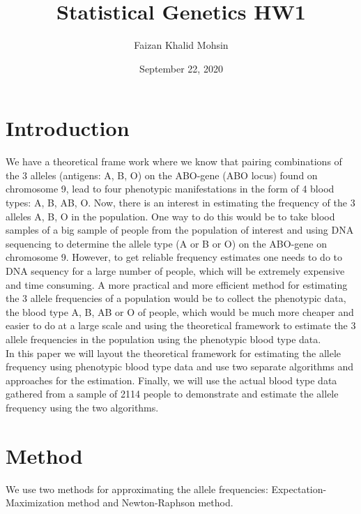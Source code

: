 \documentclass[]{article}
\title{Statistical Genetics HW1}
\author{Faizan Khalid Mohsin}
\date{September 22, 2020}
\begin{document}
\maketitle

\section{Introduction}\label{introduction}

We have a theoretical frame work where we know that pairing combinations
of the 3 alleles (antigens: A, B, O) on the ABO-gene (ABO locus) found
on chromosome 9, lead to four phenotypic manifestations in the form of 4
blood types: A, B, AB, O. Now, there is an interest in estimating the
frequency of the 3 alleles A, B, O in the population. One way to do this
would be to take blood samples of a big sample of people from the
population of interest and using DNA sequencing to determine the allele
type (A or B or O) on the ABO-gene on chromosome 9. However, to get
reliable frequency estimates one needs to do to DNA sequency for a large
number of people, which will be extremely expensive and time consuming.
A more practical and more efficient method for estimating the 3 allele
frequencies of a population would be to collect the phenotypic data, the
blood type A, B, AB or O of people, which would be much more cheaper and
easier to do at a large scale and using the theoretical framework to
estimate the 3 allele frequencies in the population using the phenotypic
blood type data.\\
In this paper we will layout the theoretical framework for estimating
the allele frequency using phenotypic blood type data and use two
separate algorithms and approaches for the estimation. Finally, we will
use the actual blood type data gathered from a sample of 2114 people to
demonstrate and estimate the allele frequency using the two algorithms.

\section{Method}\label{method}

We use two methods for approximating the allele frequencies:
Expectation-Maximization method and Newton-Raphson method.
\end{document}
